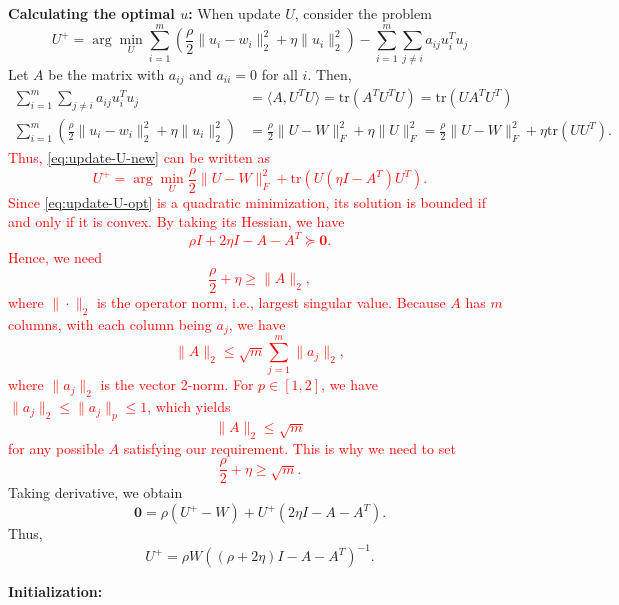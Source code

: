 {{\bf Calculating the optimal $u$:} When update $U$, consider the problem
\begin{equation}
    \label{eq:update-U-new}
    U^+ = \arg\min_U \sum_{i=1}^m\left(\frac{\rho}{2}\|u_i - w_i\|_2^2 + \eta\|u_i\|_2^2\right) - \sum_{i=1}^m\sum_{j\neq i} a_{ij}u_i^Tu_j
\end{equation}
Let $A$ be the matrix with $a_{ij}$ and $a_{ii} = 0$ for all $i$. Then,
$$ 
\begin{aligned}
\sum_{i=1}^m\sum_{j\neq i} a_{ij}u_i^Tu_j & = \langle A, U^TU\rangle = \mbox{tr}(A^TU^TU) = \mbox{tr}(UA^TU^T) \\
\sum_{i=1}^m\left(\frac{\rho}{2}\|u_i - w_i\|_2^2 + \eta\|u_i\|_2^2\right) & = \frac{\rho}{2}\|U - W\|_F^2 + \eta\|U\|_F^2 = \frac{\rho}{2}\|U - W\|_F^2 + \eta\mbox{tr}(UU^T).
\end{aligned}
$$
\textcolor{red}{
Thus, \eqref{eq:update-U-new} can be written as
\begin{equation}
\label{eq:update-U-opt}
U^+ = \arg\min_U \frac{\rho}{2}\|U - W\|_F^2 + \mbox{tr}(U(\eta I - A^T)U^T). 
\end{equation} 
Since \eqref{eq:update-U-opt} is a quadratic minimization, its solution is bounded if and only if it is convex. By taking its Hessian, we have
$$ \rho I + 2\eta I - A - A^T \succeq \mathbf{0}. $$
Hence, we need 
$$ \frac{\rho}{2} + \eta \geq \|A\|_2, $$
where $\|\cdot\|_2$ is the operator norm, i.e., largest singular value. Because $A$ has $m$ columns, with each column being $a_j$, we have
$$ \|A\|_2 \leq \sqrt{m}\sum_{j=1}^m\|a_j\|_2, $$
where $\|a_j\|_2$ is the vector 2-norm. For $p\in[1,2]$, we have $\|a_j\|_2 \leq \|a_j\|_p \leq 1$, which yields
$$ \|A\|_2 \leq \sqrt{m} $$ 
for any possible $A$ satisfying our requirement. This is why we need to set 
$$ \frac{\rho}{2} + \eta \geq \sqrt{m}. $$
}
Taking derivative, we obtain
$$ \mathbf{0} = \rho(U^+ - W) + U^+(2\eta I - A - A^T). $$
Thus,
$$ U^+ = \rho W\left((\rho+2\eta )I - A - A^T\right)^{-1}. $$



\begin{algorithm}[!t]
\caption{An algorithm}
\textbf{Initialization:}\\


\end{algorithm}}
